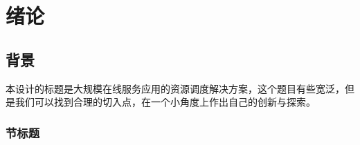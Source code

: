 
\section{绪论}

\subsection{背景}

本设计的标题是大规模在线服务应用的资源调度解决方案，这个题目有些宽泛，但是我们可以找到合理的切入点，在一个小角度上作出自己的创新与探索。

\subsubsection{节标题}
